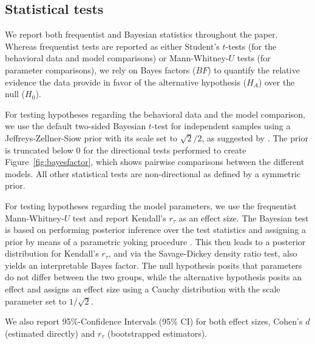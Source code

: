 
\subsection*{Statistical tests}
We report both frequentist and Bayesian statistics throughout the paper. Whereas frequentist tests are reported as either Student's $t$-tests (for the behavioral data and model comparisons) or Mann-Whitney-$U$ tests (for parameter comparisons), we rely on Bayes factors ($BF$) to quantify the relative evidence the data provide in favor of the alternative hypothesis ($H_A$) over the null ($H_0$).

For testing hypotheses regarding the behavioral data and the model comparison, we use the default two-sided Bayesian $t$-test for independent samples using a Jeffreys-Zellner-Siow prior with its scale set to $\sqrt{2}/2$, as suggested by \citet{rouder2009bayesian}. The prior is truncated below $0$ for the directional tests performed to create Figure~\ref{fig:bayesfactor}, which shows pairwise comparisons between the different models. All other statistical tests are non-directional as defined by a symmetric prior.

For testing hypotheses regarding the model parameters, we use the frequentist Mann-Whitney-$U$ test and report Kendall's $r_\tau$ as an effect size. The Bayesian test is based on performing posterior inference over the test statistics and assigning a prior by means of a parametric yoking procedure \citep{van2017bayesian}. This then leads to a posterior distribution for Kendall's $r_\tau$, and via the Savage-Dickey density ratio test, also yields an interpretable Bayes factor. The null hypothesis posits that parameters do not differ between the two groups, while the alternative hypothesis posits an effect and assigns an effect size using a Cauchy distribution with the scale parameter set to $1/\sqrt{2}$.

We also report 95\%-Confidence Intervals (95\% CI) for both effect sizes, Cohen's $d$ (estimated directly) and $r_{\tau}$ (bootstrapped estimators).

